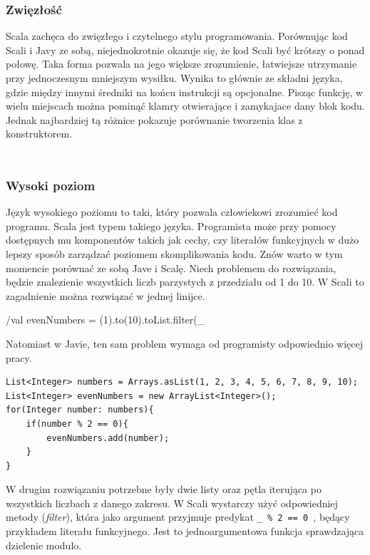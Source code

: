 \documentclass[brudnopis]{xmgr}
\begin{document}
\subsubsection{Zwięzłość}

Scala zachęca do zwięzłego i czytelnego stylu programowania. Porównując kod Scali i Javy ze sobą, niejednokrotnie okazuje się, że kod Scali być krótszy o ponad połowę. Taka forma pozwala na jego większe zrozumienie, łatwiejsze utrzymanie przy jednoczesnym mniejszym wysiłku. Wynika to głównie ze składni języka, gdzie między innymi średniki na końcu instrukcji są opcjonalne. Pisząc funkcję, w wielu miejscach można pominąć klamry otwierające i zamykajace dany blok kodu. Jednak najbardziej tą różnice pokazuje porównanie tworzenia klas z konstruktorem.

\inputminted[fontsize=\small,label=Person.java,frame=single,framerule=0pt,framesep=2pt]{java}{code/person.java}

\inputminted[fontsize=\small,label=Person.scala,frame=single,framerule=0pt,framesep=2pt]{scala}{code/person.scala}

\subsubsection{Wysoki poziom}

Język wysokiego poziomu to taki, który pozwala człowiekowi zrozumieć kod programu. Scala jest typem takiego języka. Programista może przy pomocy dostępnych mu komponentów takich jak cechy, czy literałów funkcyjnych w dużo lepszy sposób zarządzać poziomem skomplikowania kodu. Znów warto w tym momencie porównać ze sobą Jave i Scalę. Niech problemem do rozwiązania, będzie znalezienie wszystkich liczb parzystych z przedziału od 1 do 10. W Scali to zagadnienie można rozwiązać w jednej linijce.

/val evenNumbers = (1).to(10).toList.filter(_ %

Natomiast w Javie, ten sam problem wymaga od programisty odpowiednio więcej pracy.

\begin{verbatim}
List<Integer> numbers = Arrays.asList(1, 2, 3, 4, 5, 6, 7, 8, 9, 10);
List<Integer> evenNumbers = new ArrayList<Integer>();
for(Integer number: numbers){
    if(number % 2 == 0){
        evenNumbers.add(number);
    }
}
\end{verbatim}

W drugim rozwiązaniu potrzebne były dwie listy oraz pętla iterująca po wszystkich liczbach z danego zakresu. W Scali wystarczy użyć odpowiedniej metody (\emph{filter}), która jako argument przyjmuje predykat \texttt{\_ \% 2 == 0 }, będący przykładem literału funkcyjnego. Jest to jednoargumentowa funkcja sprawdzająca dzielenie modulo.
\end{document}
